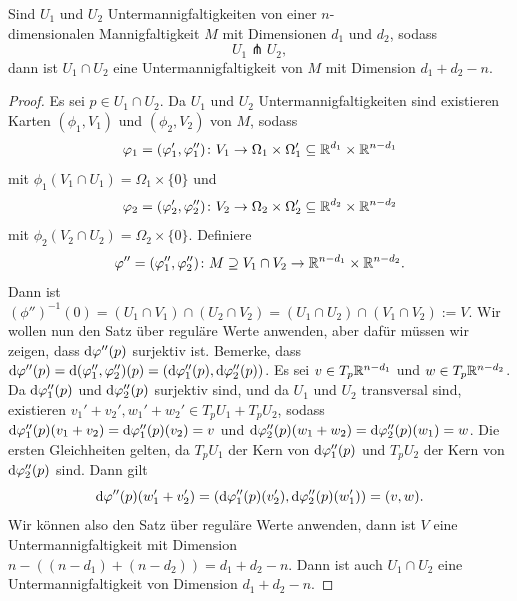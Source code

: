 \begin{prop}
    \label{prop: schnitt von transversalen untermannigfaltigkeiten}
    Sind $U_1$ und $U_2$ Untermannigfaltigkeiten von einer $n$-\\
    dimensionalen Mannigfaltigkeit $M$ mit 
    Dimensionen $d_1$ und $d_2$, sodass 
    \[ U_1 \pitchfork U_2 , \]
    dann ist $U_1 \cap U_2$ eine Untermannigfaltigkeit von $M$ mit Dimension $d_1 + d_2 - n$.
\end{prop}

\begin{proof}
    Es sei $p \in U_1 \cap U_2$. Da $U_1$ und $U_2$ Untermannigfaltigkeiten sind existieren 
    Karten $(\phi_1, V_1)$ und $(\phi_2, V_2)$ von $M$, sodass 
    \[ \varphi_1 = (\varphi_1', \varphi_1'') \colon V_1 \to 
        \Omega_1 \times \Omega_1' \subseteq { \mathbb R }^{d_1} \times { \mathbb R }^{n - d_1} \]
    mit $\phi_1(V_1 \cap U_1) = \Omega_1 \times \{ 0 \}$ und 
    \[ \varphi_2 = (\varphi_2', \varphi_2'')\colon V_2 \to 
        \Omega_2 \times \Omega_2' \subseteq { \mathbb R }^{d_2} \times { \mathbb R }^{n - d_2} \]
    mit $\phi_2(V_2 \cap U_2) = \Omega_2 \times \{ 0 \}$. Definiere 
    \[ \varphi'' = (\varphi_1'', \varphi_2'') \colon 
        M \supseteq V_1 \cap V_2 \to { \mathbb R }^{n - d_1} \times { \mathbb R }^{n - d_2}. \]
    Dann ist 
    $(\phi'')^{-1}(0) = (U_1 \cap V_1) \cap (U_2 \cap V_2) = (U_1 \cap U_2) \cap (V_1 \cap V_2) := V$.
    Wir wollen nun den Satz über reguläre Werte anwenden, aber dafür müssen wir zeigen, dass 
    ${ \operatorname{d} } \varphi'' (p)$ surjektiv ist. Bemerke, dass 
    ${ \operatorname{d} } \varphi'' (p) = { \operatorname{d} } (\varphi''_1, \varphi''_2) (p) = ({ \operatorname{d} } \varphi''_1 (p), { \operatorname{d} } \varphi''_2 (p))$.
    Es sei $v \in T_p { \mathbb R }^{n - d_1}$ und $w \in T_p{ \mathbb R }^{n - d_2}$. Da ${ \operatorname{d} } \varphi''_1 (p)$ und 
    ${ \operatorname{d} } \varphi''_2 (p)$ surjektiv sind, und da $U_1$ und $U_2$ transversal sind, 
    existieren $v_1' + v_2', w_1' + w_2' \in T_pU_1 + T_pU_2$, sodass 
    ${ \operatorname{d} } \varphi''_1 (p) (v_1 + v_2) = { \operatorname{d} } \varphi''_1 (p) (v_2) = v$ und 
    ${ \operatorname{d} } \varphi''_2 (p) (w_1 + w_2) = { \operatorname{d} } \varphi''_2 (p) (w_1) = w$.
    Die ersten Gleichheiten gelten, da $T_p U_1$ der Kern von ${ \operatorname{d} } \varphi''_1 (p)$ und 
    $T_p U_2$ der Kern von ${ \operatorname{d} } \varphi''_2 (p)$ sind. Dann gilt
    \[ { \operatorname{d} } \varphi'' (p) (w_1' + v_2')  = 
        ( { \operatorname{d} } \varphi''_1 (p) (v_2'), { \operatorname{d} } \varphi''_2 (p) (w_1')) = (v, w) . \]
    Wir können also den Satz über reguläre Werte anwenden, dann ist $V$ eine Untermannigfaltigkeit
    mit Dimension $n - ((n - d_1) + (n - d_2)) = d_1 + d_2 - n$. Dann ist auch $U_1 \cap U_2$
    eine Untermannigfaltigkeit von Dimension $d_1 + d_2 - n$.
\end{proof}

